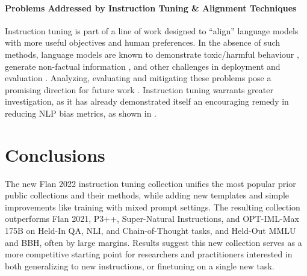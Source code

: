 \paragraph{Problems Addressed by Instruction Tuning \& Alignment Techniques} Instruction tuning is part of a line of work designed to ``align'' language models with more useful objectives and human preferences. In the absence of such methods, language models are known to demonstrate toxic/harmful behaviour \citep{sheng-etal-2019-woman,liang2021towards,wallace-etal-2019-universal}, generate non-factual information \citep{maynez-etal-2020-faithfulness,longpre2021entity,devaraj-etal-2022-evaluating}, and other challenges in deployment and evaluation \citep{zellers2019defending,mcguffie2020radicalization,talat2022you}. Analyzing, evaluating and mitigating these problems pose a promising direction for future work \citep{gao2022attributed,ganguli2022red}. Instruction tuning warrants greater investigation, as it has already demonstrated itself an encouraging remedy in reducing NLP bias metrics, as shown in \citet{chung2022scaling}.

\section{Conclusions}
The new Flan 2022 instruction tuning collection unifies the most popular prior public collections and their methods, while adding new templates and simple improvements like training with mixed prompt settings. The resulting collection outperforms Flan 2021, P3++, Super-Natural Instructions, and OPT-IML-Max 175B on Held-In QA, NLI, and Chain-of-Thought tasks, and Held-Out MMLU and BBH, often by large margins. Results suggest this new collection serves as a more competitive starting point for researchers and practitioners interested in both generalizing to new instructions, or finetuning on a single new task.


